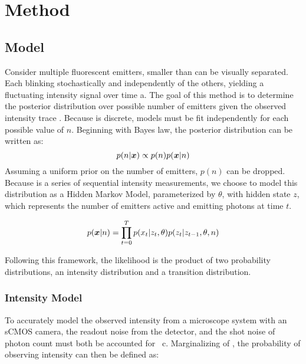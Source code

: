 \section{Method}

\subsection{Model}
Consider multiple fluorescent emitters, smaller than can be visually separated.
  Each blinking stochastically and independently of the others, 
  yielding a fluctuating intensity signal over time a.
  The goal of this method is to determine the posterior distribution over 
  possible number of emitters \ndist given the observed intensity trace \trace.
  Because \ndist is discrete, models must be fit independently for each possible value of $n$.
  Beginning with Bayes law, the posterior distribution can be written as:
  \begin{equation*}
    p(n | \bm{x}) \propto p(n) p(\bm{x} | n)
  \end{equation*}
  Assuming a uniform prior on the number of emitters, $p(n)$ can be dropped.
  Because \trace is a series of sequential intensity measurements, 
    we choose to model this distribution as a Hidden Markov Model, parameterized by $\theta$,
     with hidden state $z$, which represents the number of emitters active and emitting photons at time $t$.
    
  \begin{equation}
    p(\bm{x}| n) = \prod_{t=0}^{T} p(x_{t} | z_{t}, \theta) p(z_{t} | z_{t-1}, \theta, n)
    \label{eq:method:HMM}
  \end{equation}

  Following this framework, the likelihood is the product of two probability distributions,
  an intensity distribution and a transition distribution. 

\subsubsection{Intensity Model}

To accurately model the observed intensity from a microscope system with an sCMOS camera, 
  the readout noise from the detector, and the shot noise of photon count must both be accounted for~\cite{huang_video-rate_2013} c.
  Marginalizing of \photons, the probability of observing intensity \x{} can then be defined as:

